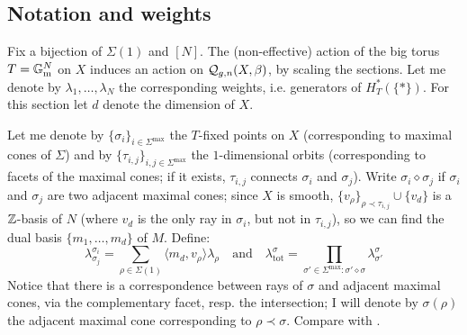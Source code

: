 \subsection{Notation and weights} Fix a bijection of $\Sigma(1)$ and $[N]$. The (non-effective) action of the big torus $T=\mathbb{G}_{\text{m}}^N$ on $X$ induces an action on $\mathcal{Q}_{g,n}(X,\beta)$, by scaling the sections. Let me denote by $\lambda_1,\ldots,\lambda_N$ the corresponding weights, i.e. generators of $H^*_T(\{*\})$. For this section let $d$ denote the dimension of $X$.

Let me denote by $\{\sigma_i\}_{i\in\Sigma^\text{max}}$ the $T$-fixed points on $X$ (corresponding to maximal cones of $\Sigma$) and by $\{\tau_{i,j}\}_{i,j\in\Sigma^\text{max}}$ the $1$-dimensional orbits (corresponding to facets of the maximal cones; if it exists, $\tau_{i,j}$ connects $\sigma_i$ and $\sigma_j$).
Write $\sigma_i\diamond\sigma_j$ if $\sigma_i$ and $\sigma_j$ are two adjacent maximal cones; since $X$ is smooth, $\{v_\rho\}_{\rho\prec\tau_{i,j}}\cup\{v_d\}$ is a $\mathbb{Z}$-basis of $N$ (where $v_d$ is the only ray in $\sigma_i$, but not in $\tau_{i,j}$), so we can find the dual basis $\{m_1,\ldots,m_d\}$ of $M$. Define: \[\lambda^{\sigma_i}_{\sigma_j}=\sum_{\rho\in\Sigma(1)}\langle m_d,v_\rho\rangle\lambda_\rho \quad \text{and} \quad \lambda^{\sigma}_{\text{tot}}=\prod_{\sigma'\in\Sigma^{\text{max}}\colon\sigma'\diamond\sigma}\lambda^\sigma_{\sigma'}\] Notice that there is a correspondence between rays of $\sigma$ and adjacent maximal cones, via the complementary facet, resp. the intersection; I will denote by $\sigma(\rho)$ the adjacent maximal cone corresponding to $\rho\prec\sigma$. Compare with \cite[\S\S 6.4 and 7.3]{HolgerSpielberg}.

